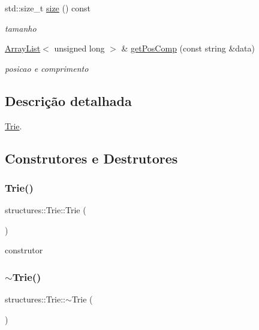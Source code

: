 \begin{DoxyCompactItemize}
std\+::size\+\_\+t \mbox{\hyperlink{classstructures_1_1Trie_a4a4081191fa839c7d41e85577a46d7c7}{size}} () const
\begin{DoxyCompactList}\small\item\em tamanho \end{DoxyCompactList}\item 
\mbox{\hyperlink{classstructures_1_1ArrayList}{Array\+List}}$<$ unsigned long $>$ \& \mbox{\hyperlink{classstructures_1_1Trie_a93269c724024a2c2651203b2b034fbb5}{get\+Pos\+Comp}} (const string \&data)
\begin{DoxyCompactList}\small\item\em posicao e comprimento \end{DoxyCompactList}\end{DoxyCompactItemize}


\subsection{Descrição detalhada}
\mbox{\hyperlink{classstructures_1_1Trie}{Trie}}. 

\subsection{Construtores e Destrutores}
\mbox{\label{classstructures_1_1Trie_af6cf71564b040dfc62bbdedbbab8271a}} 
\subsubsection{\texorpdfstring{Trie()}{Trie()}}
{\footnotesize\ttfamily structures\+::\+Trie\+::\+Trie (\begin{DoxyParamCaption}{ }\end{DoxyParamCaption})}



construtor 

\mbox{\label{classstructures_1_1Trie_afc4b294e25004ee33d37a044cad6d342}} 
\subsubsection{\texorpdfstring{$\sim$Trie()}{~Trie()}}
{\footnotesize\ttfamily structures\+::\+Trie\+::$\sim$\+Trie (\begin{DoxyParamCaption}{ }\end{DoxyParamCaption})}



